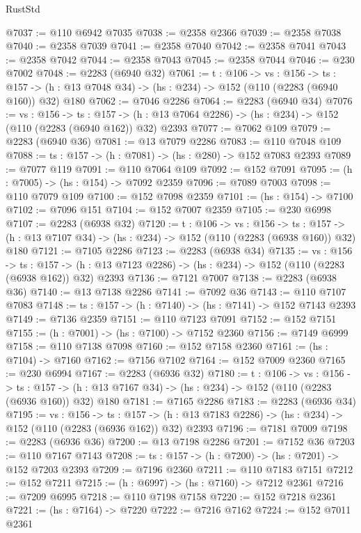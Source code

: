 \begin{lexlean}{RustStd}
\begin{coremodule}
@7037 := @110 @6942 @7035
@7038 := @2358 @2366
@7039 := @2358 @7038
@7040 := @2358 @7039
@7041 := @2358 @7040
@7042 := @2358 @7041
@7043 := @2358 @7042
@7044 := @2358 @7043
@7045 := @2358 @7044
@7046 := @230 @7002
@7048 := @2283 (@6940 @32)
@7061 := {t : @106} ->
  {vs : @156} ->
  {ts : @157} -> (h : @13 @7048 @34) -> (hs : @234) -> @152 (@110 (@2283 (@6940 @160)) @32) @180
@7062 := @7046 @2286
@7064 := @2283 (@6940 @34)
@7076 := {vs : @156} ->
  {ts : @157} -> (h : @13 @7064 @2286) -> (hs : @234) -> @152 (@110 (@2283 (@6940 @162)) @32) @2393
@7077 := @7062 @109
@7079 := @2283 (@6940 @36)
@7081 := @13 @7079 @2286
@7083 := @110 @7048 @109
@7088 := {ts : @157} -> (h : @7081) -> (hs : @280) -> @152 @7083 @2393
@7089 := @7077 @119
@7091 := @110 @7064 @109
@7092 := @152 @7091
@7095 := (h : @7005) -> (hs : @154) -> @7092 @2359
@7096 := @7089 @7003
@7098 := @110 @7079 @109
@7100 := @152 @7098 @2359
@7101 := (hs : @154) -> @7100
@7102 := @7096 @151
@7104 := @152 @7007 @2359
@7105 := @230 @6998
@7107 := @2283 (@6938 @32)
@7120 := {t : @106} ->
  {vs : @156} ->
  {ts : @157} -> (h : @13 @7107 @34) -> (hs : @234) -> @152 (@110 (@2283 (@6938 @160)) @32) @180
@7121 := @7105 @2286
@7123 := @2283 (@6938 @34)
@7135 := {vs : @156} ->
  {ts : @157} -> (h : @13 @7123 @2286) -> (hs : @234) -> @152 (@110 (@2283 (@6938 @162)) @32) @2393
@7136 := @7121 @7007
@7138 := @2283 (@6938 @36)
@7140 := @13 @7138 @2286
@7141 := @7092 @36
@7143 := @110 @7107 @7083
@7148 := {ts : @157} -> (h : @7140) -> (hs : @7141) -> @152 @7143 @2393
@7149 := @7136 @2359
@7151 := @110 @7123 @7091
@7152 := @152 @7151
@7155 := (h : @7001) -> (hs : @7100) -> @7152 @2360
@7156 := @7149 @6999
@7158 := @110 @7138 @7098
@7160 := @152 @7158 @2360
@7161 := (hs : @7104) -> @7160
@7162 := @7156 @7102
@7164 := @152 @7009 @2360
@7165 := @230 @6994
@7167 := @2283 (@6936 @32)
@7180 := {t : @106} ->
  {vs : @156} ->
  {ts : @157} -> (h : @13 @7167 @34) -> (hs : @234) -> @152 (@110 (@2283 (@6936 @160)) @32) @180
@7181 := @7165 @2286
@7183 := @2283 (@6936 @34)
@7195 := {vs : @156} ->
  {ts : @157} -> (h : @13 @7183 @2286) -> (hs : @234) -> @152 (@110 (@2283 (@6936 @162)) @32) @2393
@7196 := @7181 @7009
@7198 := @2283 (@6936 @36)
@7200 := @13 @7198 @2286
@7201 := @7152 @36
@7203 := @110 @7167 @7143
@7208 := {ts : @157} -> (h : @7200) -> (hs : @7201) -> @152 @7203 @2393
@7209 := @7196 @2360
@7211 := @110 @7183 @7151
@7212 := @152 @7211
@7215 := (h : @6997) -> (hs : @7160) -> @7212 @2361
@7216 := @7209 @6995
@7218 := @110 @7198 @7158
@7220 := @152 @7218 @2361
@7221 := (hs : @7164) -> @7220
@7222 := @7216 @7162
@7224 := @152 @7011 @2361

\end{coremodule}
\end{lexlean}

